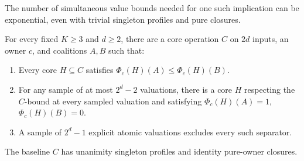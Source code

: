 The number of simultaneous value bounds needed for one such implication
can be exponential, even with trivial singleton profiles and pure closures.

\begin{theorem}
\label{core:thm:principal-profile-locality}
For every fixed $K\geq3$ and $d\geq2$, there are a core operation $C$
on $2d$ inputs, an owner $c$, and coalitions $A,B$ such that:
\begin{enumerate}
\item Every core $H\subseteq C$ satisfies
  $\Phi_c(H)(A)\leq\Phi_c(H)(B)$.
\item For any sample of at most $2^d-2$ valuations, there is a core $H$
  respecting the $C$-bound at every sampled valuation and satisfying
  $\Phi_c(H)(A)=1$, $\Phi_c(H)(B)=0$.
\item A sample of $2^d-1$ explicit atomic valuations excludes every
  such separator.
\end{enumerate}
The baseline $C$ has unanimity singleton profiles and identity pure-owner
closures.
\end{theorem}
